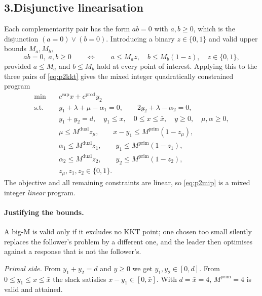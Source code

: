 \documentclass[11pt]{article}
\DeclareMathOperator*{\minimize}{min}
\theoremstyle{definition}
\begin{document}
\subsection*{3.\quad Disjunctive linearisation}

Each complementarity pair has the form $ab = 0$ with $a,b \ge 0$, which
is the disjunction $(a = 0) \vee (b = 0)$. Introducing a binary
$z \in \{0,1\}$ and valid upper bounds $M_a, M_b$,
\[
  ab = 0,\; a,b \ge 0
  \qquad\Longleftrightarrow\qquad
  a \le M_a z, \quad b \le M_b (1-z), \quad z \in \{0,1\},
\]
provided $a \le M_a$ and $b \le M_b$ hold at every point of interest.
Applying this to the three pairs of \eqref{eq:p2kkt} gives the mixed
integer quadratically constrained program
\begin{equation}\label{eq:p2mip}
\begin{aligned}
  \minimize\quad & c^{\mathrm{cap}} x + c^{\mathrm{prod}} y_2\\
  \text{s.t.}\quad
    & y_1 + \lambda + \mu - \alpha_1 = 0, \qquad
      2y_2 + \lambda - \alpha_2 = 0,\\
    & y_1 + y_2 = d, \quad y_1 \le x, \quad 0 \le x \le \bar{x},
      \quad y \ge 0, \quad \mu, \alpha \ge 0,\\
    & \mu \le M^{\mathrm{dual}} z_\mu, \qquad
      x - y_1 \le M^{\mathrm{prim}}(1 - z_\mu),\\
    & \alpha_1 \le M^{\mathrm{dual}} z_1, \qquad
      y_1 \le M^{\mathrm{prim}}(1 - z_1),\\
    & \alpha_2 \le M^{\mathrm{dual}} z_2, \qquad
      y_2 \le M^{\mathrm{prim}}(1 - z_2),\\
    & z_\mu, z_1, z_2 \in \{0,1\} .
\end{aligned}
\end{equation}
The objective and all remaining constraints are linear, so
\eqref{eq:p2mip} is a mixed integer \emph{linear} program.

\paragraph{Justifying the bounds.} A big-M is valid only if it excludes
no KKT point; one chosen too small silently replaces the follower's
problem by a different one, and the leader then optimises against a
response that is not the follower's.

\emph{Primal side.} From $y_1 + y_2 = d$ and $y \ge 0$ we get
$y_1, y_2 \in [0,d]$. From $0 \le y_1 \le x \le \bar{x}$ the slack
satisfies $x - y_1 \in [0,\bar{x}]$. With $d = \bar{x} = 4$,
$M^{\mathrm{prim}} = 4$ is valid and attained.
\end{document}
